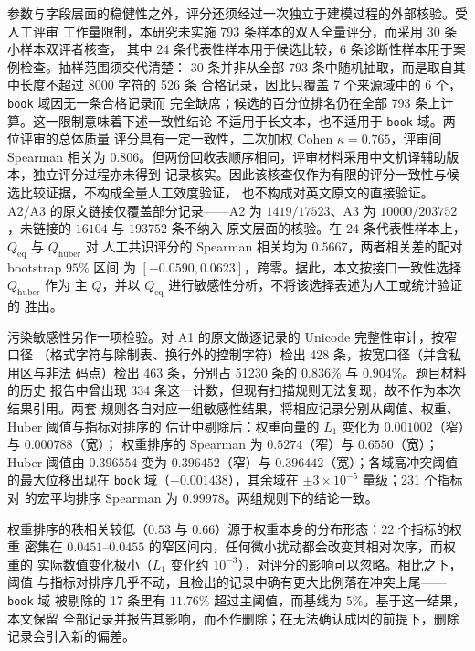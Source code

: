 \documentclass[bwprint]{gmcmthesis}
\numberwithin{equation}{section}
\numberwithin{figure}{section}
\numberwithin{table}{section}
\begin{document}
参数与字段层面的稳健性之外，评分还须经过一次独立于建模过程的外部核验。受人工评审
工作量限制，本研究未实施 793 条样本的双人全量评分，而采用 30 条小样本双评者核查，
其中 24 条代表性样本用于候选比较，6 条诊断性样本用于案例检查。抽样范围须交代清楚：
30 条并非从全部 793 条中随机抽取，而是取自其中长度不超过 8000 字符的 526 条
合格记录，因此只覆盖 7 个来源域中的 6 个，\texttt{book} 域因无一条合格记录而
完全缺席；候选的百分位排名仍在全部 793 条上计算。这一限制意味着下述一致性结论
不适用于长文本，也不适用于 \texttt{book} 域。两位评审的总体质量
评分具有一定一致性，二次加权 Cohen $\kappa=0.765$，评审间 Spearman 相关为
$0.806$。但两份回收表顺序相同，评审材料采用中文机译辅助版本，独立评分过程亦未得到
记录核实。因此该核查仅作为有限的评分一致性与候选比较证据，不构成全量人工效度验证，
也不构成对英文原文的直接验证。A2/A3 的原文链接仅覆盖部分记录——A2 为
$1419/17523$、A3 为 $10000/203752$，未链接的 $16104$ 与 $193752$ 条不纳入
原文层面的核验。在 24 条代表性样本上，$Q_{\mathrm{eq}}$ 与 $Q_{\mathrm{huber}}$ 对
人工共识评分的 Spearman 相关均为 $0.5667$，两者相关差的配对 bootstrap $95\%$ 区间
为 $[-0.0590,0.0623]$，跨零。据此，本文按接口一致性选择 $Q_{\mathrm{huber}}$ 作为
主 $Q$，并以 $Q_{\mathrm{eq}}$ 进行敏感性分析，不将该选择表述为人工或统计验证的
胜出。

污染敏感性另作一项检验。对 A1 的原文做逐记录的 Unicode 完整性审计，按窄口径
（格式字符与除制表、换行外的控制字符）检出 428 条，按宽口径（并含私用区与非法
码点）检出 463 条，分别占 51230 条的 $0.836\%$ 与 $0.904\%$。题目材料的历史
报告中曾出现 334 条这一计数，但现有扫描规则无法复现，故不作为本次结果引用。两套
规则各自对应一组敏感性结果，将相应记录分别从阈值、权重、Huber 阈值与指标对排序的
估计中剔除后：权重向量的 $L_1$ 变化为 $0.001002$（窄）与 $0.000788$（宽）；
权重排序的 Spearman 为 $0.5274$（窄）与 $0.6550$（宽）；Huber 阈值由 $0.396554$
变为 $0.396452$（窄）与 $0.396442$（宽）；各域高冲突阈值的最大位移出现在
\texttt{book} 域（$-0.001438$），其余域在 $\pm3\times10^{-5}$ 量级；231 个指标对
的宏平均排序 Spearman 为 $0.99978$。两组规则下的结论一致。

权重排序的秩相关较低（$0.53$ 与 $0.66$）源于权重本身的分布形态：22 个指标的权重
密集在 $0.0451$--$0.0455$ 的窄区间内，任何微小扰动都会改变其相对次序，而权重的
实际数值变化极小（$L_1$ 变化约 $10^{-3}$），对评分的影响可以忽略。相比之下，阈值
与指标对排序几乎不动，且检出的记录中确有更大比例落在冲突上尾——\texttt{book} 域
被剔除的 17 条里有 $11.76\%$ 超过主阈值，而基线为 $5\%$。基于这一结果，本文保留
全部记录并报告其影响，而不作删除；在无法确认成因的前提下，删除记录会引入新的偏差。
\end{document}
